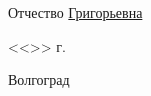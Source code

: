 \documentclass[a4paper, 14pt]{extreport}
\begin{document}
\begin{titlepage}
\begin{flushleft}
            Отчество \underline{Григорьевна\hspace{2.2cm}}
        \end{flushleft}
        \vspace{1.5cm}
        \begin{flushright}
            <<\underline{\hspace{1.0cm}}>>\underline{\hspace{4.0cm}} \the\year г.
        \end{flushright}
        \vspace{\fill}
        \begin{center}
            Волгоград \the\year
        \end{center}
    \end{titlepage}
    \tableofcontents
    \newpage
    \onehalfspacing
    
\end{document}

